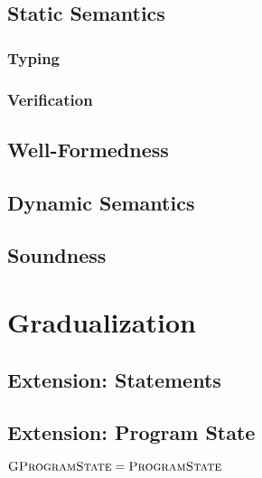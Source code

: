     \subsection{Static Semantics}
    \label{sec:static-semantics}
    
        
        \subsubsection{Typing}
        \label{sssec:typing}
        
    
        \subsubsection{Verification}
        \label{sssec:verification}
        
    
    \subsection{Well-Formedness}
    \label{sec:well-formedness}
    
    
    \subsection{Dynamic Semantics}
    \label{ssec:dynamic-semantics}
    
    
    \subsection{Soundness}

\section{Gradualization}
\label{sec:cs-gradual-formulas}


    \subsection{Extension: Statements}
    \label{ssec:extension--statements}
    

    \subsection{Extension: Program State}
    $\textsc{GProgramState} = \textsc{ProgramState}$

